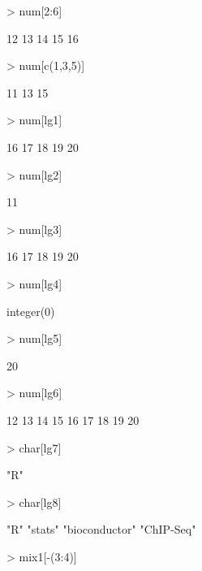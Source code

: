 \documentclass[12pt]{article}
\begin{document}
\begin{Schunk}
\begin{Sinput}
> num[2:6]
\end{Sinput}
\begin{Soutput}
[1] 12 13 14 15 16
\end{Soutput}
\begin{Sinput}
> num[c(1,3,5)]
\end{Sinput}
\begin{Soutput}
[1] 11 13 15
\end{Soutput}
\begin{Sinput}
> num[lg1]
\end{Sinput}
\begin{Soutput}
[1] 16 17 18 19 20
\end{Soutput}
\begin{Sinput}
> num[lg2]
\end{Sinput}
\begin{Soutput}
[1] 11
\end{Soutput}
\begin{Sinput}
> num[lg3]
\end{Sinput}
\begin{Soutput}
[1] 16 17 18 19 20
\end{Soutput}
\begin{Sinput}
> num[lg4]
\end{Sinput}
\begin{Soutput}
integer(0)
\end{Soutput}
\begin{Sinput}
> num[lg5]
\end{Sinput}
\begin{Soutput}
[1] 20
\end{Soutput}
\begin{Sinput}
> num[lg6]
\end{Sinput}
\begin{Soutput}
[1] 12 13 14 15 16 17 18 19 20
\end{Soutput}
\begin{Sinput}
> char[lg7]
\end{Sinput}
\begin{Soutput}
[1] "R"
\end{Soutput}
\begin{Sinput}
> char[lg8]
\end{Sinput}
\begin{Soutput}
[1] "R"            "stats"        "bioconductor" "ChIP-Seq"    
\end{Soutput}
\begin{Sinput}
> mix1[-(3:4)]
\end{Sinput}

\end{Schunk}
\end{document}
